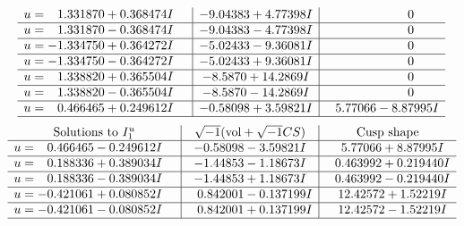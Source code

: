 \documentclass[1p]{elsarticle_modified}
\theoremstyle{definition}
\newcommand{\I}{\sqrt{-1}}
\begin{document}
$$\begin{array}{c|c|c}
\begin{aligned}
u &= \phantom{-}1.331870 + 0.368474 I\end{aligned}
 & -9.04383 + 4.77398 I & \phantom{-0.000000 } 0 \\ \hline\begin{aligned}
u &= \phantom{-}1.331870 - 0.368474 I\end{aligned}
 & -9.04383 - 4.77398 I & \phantom{-0.000000 } 0 \\ \hline\begin{aligned}
u &= -1.334750 + 0.364272 I\end{aligned}
 & -5.02433 - 9.36081 I & \phantom{-0.000000 } 0 \\ \hline\begin{aligned}
u &= -1.334750 - 0.364272 I\end{aligned}
 & -5.02433 + 9.36081 I & \phantom{-0.000000 } 0 \\ \hline\begin{aligned}
u &= \phantom{-}1.338820 + 0.365504 I\end{aligned}
 & -8.5870 + 14.2869 I & \phantom{-0.000000 } 0 \\ \hline\begin{aligned}
u &= \phantom{-}1.338820 - 0.365504 I\end{aligned}
 & -8.5870 - 14.2869 I & \phantom{-0.000000 } 0 \\ \hline\begin{aligned}
u &= \phantom{-}0.466465 + 0.249612 I\end{aligned}
 & -0.58098 + 3.59821 I & \phantom{-}5.77066 - 8.87995 I\\
 \hline 
 \end{array}$$\newpage$$\begin{array}{c|c|c}  
\text{Solutions to }I^u_{1}& \I (\text{vol} + \sqrt{-1}CS) & \text{Cusp shape}\\
 \hline 
\begin{aligned}
u &= \phantom{-}0.466465 - 0.249612 I\end{aligned}
 & -0.58098 - 3.59821 I & \phantom{-}5.77066 + 8.87995 I \\ \hline\begin{aligned}
u &= \phantom{-}0.188336 + 0.389034 I\end{aligned}
 & -1.44853 - 1.18673 I & \phantom{-}0.463992 + 0.219440 I \\ \hline\begin{aligned}
u &= \phantom{-}0.188336 - 0.389034 I\end{aligned}
 & -1.44853 + 1.18673 I & \phantom{-}0.463992 - 0.219440 I \\ \hline\begin{aligned}
u &= -0.421061 + 0.080852 I\end{aligned}
 & \phantom{-}0.842001 - 0.137199 I & \phantom{-}12.42572 + 1.52219 I \\ \hline\begin{aligned}
u &= -0.421061 - 0.080852 I\end{aligned}
 & \phantom{-}0.842001 + 0.137199 I & \phantom{-}12.42572 - 1.52219 I\\
 \hline 
 \end{array}$$\newpage
\end{document}
